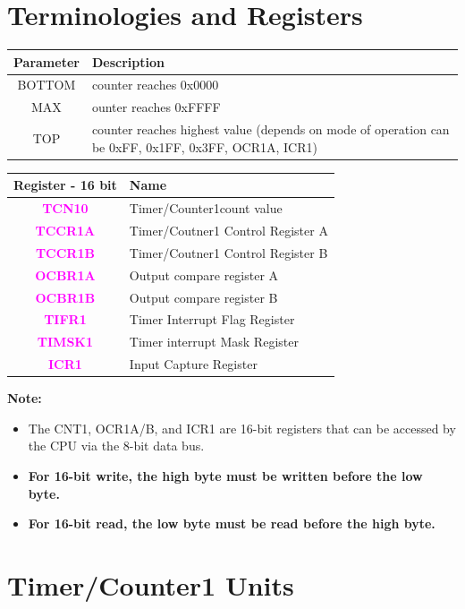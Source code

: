 \documentclass{article}
\newcommand{\regFormat}[1]{\textbf{\textcolor{magenta}{#1}}}
\begin{document}
\section{Terminologies and Registers}
\begin{minipage}{0.4\textwidth}
    \begin{tabular}{c|p{4.5cm}}
        \textbf{Parameter} & \textbf{Description}\\
        \hline
        BOTTOM & counter reaches 0x0000\\
        MAX & ounter reaches 0xFFFF\\
        TOP & counter reaches highest value (depends on mode of operation can be 0xFF, 0x1FF, 0x3FF, OCR1A, ICR1)
    \end{tabular}
\end{minipage}
\begin{minipage}{0.55\textwidth}
    \begin{tabular}{c|p{5.5cm}}
        \textbf{Register - 16 bit} & \textbf{Name}\\
        \hline
        \regFormat{TCN10} & Timer/Counter1count value\\
        \regFormat{TCCR1A} & Timer/Coutner1 Control Register A\\
        \regFormat{TCCR1B} & Timer/Coutner1 Control Register B\\
        \regFormat{OCBR1A} & Output compare register A\\
        \regFormat{OCBR1B} & Output compare register B\\
        \regFormat{TIFR1} & Timer Interrupt Flag Register\\
        \regFormat{TIMSK1} & Timer interrupt Mask Register\\
        \regFormat{ICR1} & Input Capture Register\\
    \end{tabular}
\end{minipage}

\textbf{Note: } 
\begin{itemize}
    \item The CNT1, OCR1A/B, and ICR1 are 16-bit registers that can be accessed by the CPU via the 8-bit data bus.
    \item \textbf{For 16-bit write, the high byte must be written before the low byte.}
    \item \textbf{For 16-bit read, the low byte must be read before the high byte.}
\end{itemize}
\section{Timer/Counter1 Units}
\end{document}
